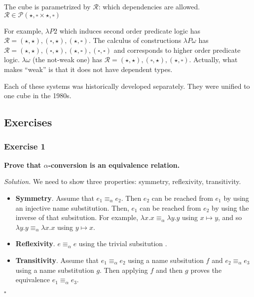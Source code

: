 The cube is parametrized by $\mathcal{R}$: which dependencies are allowed. 
$\mathcal{R} \in \mathcal{P}({\star, \square}\times{\star, \square})$

For example, $\lambda P2$ which induces second order predicate logic has $\mathcal{R} = {(\star, \star), (\square, \star), (\star, \square)}$.
The calculus of constructions $\lambda P \omega$ has $\mathcal{R} = {(\star, \star), (\square, \star), (\star, \square), (\square, \square)}$
and corresponds to higher order predicate logic.
$\lambda \omega$ (the not-weak one) has $\mathcal{R} = {(\star, \star), (\square, \star), (\star, \square)}$. 
Actually, what makes \wlo ``weak'' is that it does not have dependent types.

Each of these systems was historically developed separately. They were unified to one cube in the 1980s.

\subsection{Exercises}

\subsubsection{Exercise 1}

\textbf{Prove that $\alpha$-conversion is an equivalence relation.}

\emph{Solution.} We need to show three properties: symmetry, reflexivity, transitivity.
\begin{itemize}
\item \textbf{Symmetry}. Assume that $e_1 \equiv_\alpha e_2$. Then $e_2$ can be reached from $e_1$ by using 
an injective name substitution. Then, $e_1$ can be reached from $e_2$ by using the inverse of that subsitution.
For example, $\lambda x. x \equiv_\alpha \lambda y. y$ using ${x \mapsto y}$, and so $\lambda y. y \equiv_\alpha \lambda x. x$
using ${y \mapsto x}$.
\item \textbf{Reflexivity}. $e \equiv_\alpha e$ using the trivial subsitution ${}$.
\item \textbf{Transitivity}. Assume that $e_1 \equiv_\alpha e_2$ using a name subsitution $f$ and $e_2 \equiv_\alpha e_3$
using a name substitution $g$. Then applying $f$ and then $g$ proves the equivalence $e_1 \equiv_\alpha e_3$.
\end{itemize}
\begin{flushright}
$\square$ 
\end{flushright}

